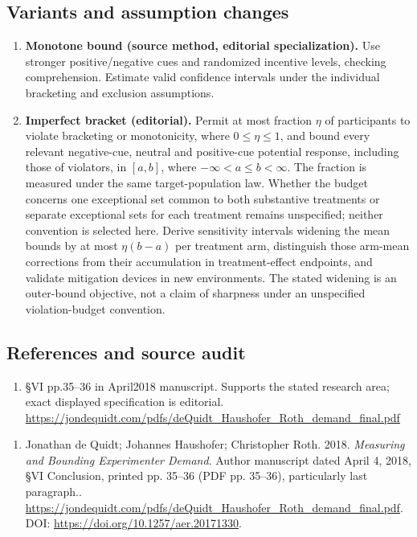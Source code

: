 \documentclass[11pt,a4paper]{article}
\begin{document}
\subsection*{Variants and assumption changes}
\begin{enumerate}
\item \textbf{Monotone bound (source method, editorial specialization).} Use stronger positive/negative cues and randomized incentive levels, checking comprehension. Estimate valid confidence intervals under the individual bracketing and exclusion assumptions.
\item \textbf{Imperfect bracket (editorial).} Permit at most fraction \(\eta\) of participants to violate bracketing or monotonicity, where \(0\le\eta\le1\), and bound every relevant negative-cue, neutral and positive-cue potential response, including those of violators, in \([a,b]\), where \(-\infty<a\le b<\infty\). The fraction is measured under the same target-population law. Whether the budget concerns one exceptional set common to both substantive treatments or separate exceptional sets for each treatment remains unspecified; neither convention is selected here. Derive sensitivity intervals widening the mean bounds by at most \(\eta(b-a)\) per treatment arm, distinguish those arm-mean corrections from their accumulation in treatment-effect endpoints, and validate mitigation devices in new environments. The stated widening is an outer-bound objective, not a claim of sharpness under an unspecified violation-budget convention.
\end{enumerate}
\subsection*{References and source audit}
\begin{enumerate}
\item §VI pp.35–36 in April2018 manuscript. Supports the stated research area; exact displayed specification is editorial. \url{https://jondequidt.com/pdfs/deQuidt_Haushofer_Roth_demand_final.pdf}
\end{enumerate}
\begin{enumerate}\raggedright
\item\hypertarget{definitions:source:30007589:1}{} Jonathan de Quidt; Johannes Haushofer; Christopher Roth. 2018. \emph{Measuring and Bounding Experimenter Demand}. Author manuscript dated April 4, 2018, §VI Conclusion, printed pp. 35–36 (PDF pp. 35–36), particularly last paragraph..
\url{https://jondequidt.com/pdfs/deQuidt_Haushofer_Roth_demand_final.pdf}.
DOI: \url{https://doi.org/10.1257/aer.20171330}.
\end{enumerate}
\end{document}
